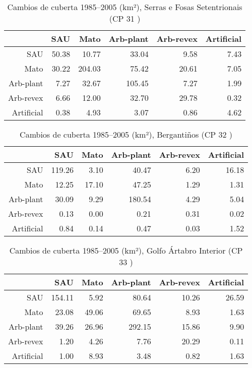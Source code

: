 \clearpage
\begin{table}[p]
\centering
\caption{Cambios de cuberta 1985--2005 (km²), Serras e Fosas Setentrionais (CP 31 )} 
\label{TaboaContinxCP31}
\begin{tabular}{rrrrrr}
  \hline
 & SAU & Mato & Arb-plant & Arb-revex & Artificial \\ 
  \hline
SAU & 50.38 & 10.77 & 33.04 & 9.58 & 7.43 \\ 
  Mato & 30.22 & 204.03 & 75.42 & 20.61 & 7.05 \\ 
  Arb-plant & 7.27 & 32.67 & 105.45 & 7.27 & 1.99 \\ 
  Arb-revex & 6.66 & 12.00 & 32.70 & 29.78 & 0.32 \\ 
  Artificial & 0.38 & 4.93 & 3.07 & 0.86 & 4.62 \\ 
   \hline
\end{tabular}
\end{table}
\begin{table}[p]
\centering
\caption{Cambios de cuberta 1985--2005 (km²), Bergantiños (CP 32 )} 
\label{TaboaContinxCP32}
\begin{tabular}{rrrrrr}
  \hline
 & SAU & Mato & Arb-plant & Arb-revex & Artificial \\ 
  \hline
SAU & 119.26 & 3.10 & 40.47 & 6.20 & 16.18 \\ 
  Mato & 12.25 & 17.10 & 47.25 & 1.29 & 1.31 \\ 
  Arb-plant & 30.09 & 9.29 & 180.54 & 4.29 & 5.04 \\ 
  Arb-revex & 0.13 & 0.00 & 0.21 & 0.31 & 0.02 \\ 
  Artificial & 0.84 & 0.14 & 0.47 & 0.03 & 1.52 \\ 
   \hline
\end{tabular}
\end{table}
\begin{table}[p]
\centering
\caption{Cambios de cuberta 1985--2005 (km²), Golfo Ártabro Interior (CP 33 )} 
\label{TaboaContinxCP33}
\begin{tabular}{rrrrrr}
  \hline
 & SAU & Mato & Arb-plant & Arb-revex & Artificial \\ 
  \hline
SAU & 154.11 & 5.92 & 80.64 & 10.26 & 26.59 \\ 
  Mato & 23.08 & 49.06 & 69.65 & 8.93 & 1.63 \\ 
  Arb-plant & 39.26 & 26.96 & 292.15 & 15.86 & 9.90 \\ 
  Arb-revex & 1.20 & 4.26 & 7.76 & 20.29 & 0.11 \\ 
  Artificial & 1.00 & 8.93 & 3.48 & 0.82 & 1.63 \\ 
   \hline
\end{tabular}
\end{table}

